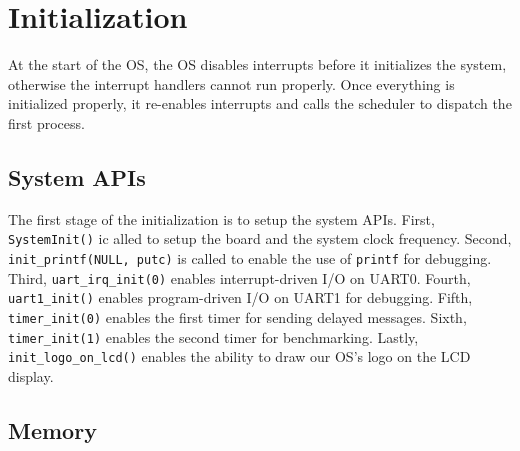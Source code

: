 \documentclass[se]{uw-wkrpt}
\begin{document}
\section{Initialization}\label{sec:init}

At the start of the OS, the OS disables interrupts before it initializes the system, otherwise the interrupt handlers cannot run properly. Once everything is initialized properly, it re-enables interrupts and calls the scheduler to dispatch the first process.

\subsection{System APIs}
The first stage of the initialization is to setup the system APIs. First, \texttt{SystemInit()} ic alled to setup the board and the system clock frequency. Second, \texttt{init\_printf(NULL, putc)} is called to enable the use of \texttt{printf} for debugging. Third, \texttt{uart\_irq\_init(0)} enables interrupt-driven I/O on UART0. Fourth, \texttt{uart1\_init()} enables program-driven I/O on UART1 for debugging. Fifth, \texttt{timer\_init(0)} enables the first timer for sending delayed messages. Sixth,  \texttt{timer\_init(1)} enables the second timer for benchmarking. Lastly, \texttt{init\_logo\_on\_lcd()} enables the ability to draw our OS's logo on the LCD display.

\subsection{Memory}
\end{document}
